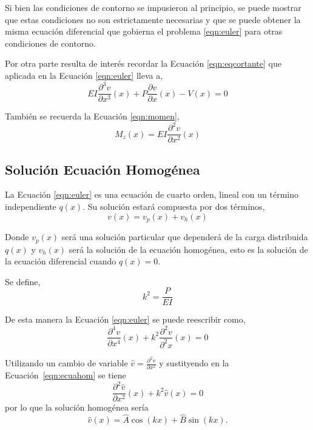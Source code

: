Si bien las condiciones de contorno se impusieron al principio, se puede mostrar que estas condiciones no son estrictamente necesarias y que se puede obtener la misma ecuación diferencial que gobierna el problema \eqref{eqn:euler} para otras condiciones de contorno.

Por otra parte resulta de interés recordar la Ecuación \eqref{eqn:eqcortante} que aplicada en la Ecuación \eqref{eqn:euler} lleva a,
\begin{equation}\label{eqn:condcortante}
EI \frac{\partial^3 v}{\partial x^3}(x) + P \frac{\partial v}{\partial x}(x) - V(x) = 0
\end{equation}

También se recuerda la Ecuación \eqref{eqn:momen},  
\begin{equation}\label{eqn:condmomento}
M_z (x) = E I \frac{\partial^2 v}{\partial x^2}(x)
\end{equation}

\subsection{Solución Ecuación Homogénea}

La Ecuación \eqref{eqn:euler} es una ecuación de cuarto orden, lineal con un término independiente $q(x)$. Su solución estará compuesta por dos términos,
\begin{equation}
v(x)= v_p(x) + v_h(x)
\end{equation}

Donde $v_p(x)$ será una solución particular que dependerá de la carga distribuida $q(x)$ y $v_h(x)$ será la solución de la ecuación homogénea, esto es la solución de la ecuación diferencial cuando $q(x)=0$.

Se define,
\begin{equation}\label{eqn:defk}
k^2=\frac{P}{EI}
\end{equation}

De esta manera la Ecuación \eqref{eqn:euler} se puede reescribir como,
\begin{equation}\label{eqn:ecuahom}
\frac{\partial^4 v}{\partial x^4}(x) + k^2 \frac{\partial^2 v}{\partial^2 x}(x) = 0
\end{equation}

Utilizando un cambio de variable $\hat{v}=\frac{\partial^2 v}{\partial x^2}$ y sustityendo en la Ecuación~\eqref{eqn:ecuahom} se tiene
$$
\frac{\partial^2 \hat{v}}{\partial x^2}(x) + k^2 \hat{v}(x) = 0
$$
por lo que la solución homogénea sería
$$
\hat{v}(x) = \hat{A} \cos (kx) + \hat{B} \sin (kx).
$$

